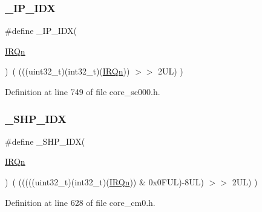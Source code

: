 \subsubsection{\texorpdfstring{\+\_\+\+I\+P\+\_\+\+I\+DX}{\_IP\_IDX}\hspace{0.1cm}{\footnotesize\ttfamily [3/3]}}
{\footnotesize\ttfamily \#define \+\_\+\+I\+P\+\_\+\+I\+DX(\begin{DoxyParamCaption}\item[{}]{\hyperlink{group___configuration__section__for___c_m_s_i_s_ga666eb0caeb12ec0e281415592ae89083}{I\+R\+Qn} }\end{DoxyParamCaption})~(   (((uint32\+\_\+t)(int32\+\_\+t)(\hyperlink{group___configuration__section__for___c_m_s_i_s_ga666eb0caeb12ec0e281415592ae89083}{I\+R\+Qn}))                $>$$>$    2\+U\+L)      )}



Definition at line 749 of file core\+\_\+sc000.\+h.

\mbox{\label{group___c_m_s_i_s___core___n_v_i_c_functions_gaee4f7eb5d7e770ad51489dbceabb1755}} 
\subsubsection{\texorpdfstring{\+\_\+\+S\+H\+P\+\_\+\+I\+DX}{\_SHP\_IDX}\hspace{0.1cm}{\footnotesize\ttfamily [1/3]}}
{\footnotesize\ttfamily \#define \+\_\+\+S\+H\+P\+\_\+\+I\+DX(\begin{DoxyParamCaption}\item[{}]{\hyperlink{group___configuration__section__for___c_m_s_i_s_ga666eb0caeb12ec0e281415592ae89083}{I\+R\+Qn} }\end{DoxyParamCaption})~( (((((uint32\+\_\+t)(int32\+\_\+t)(\hyperlink{group___configuration__section__for___c_m_s_i_s_ga666eb0caeb12ec0e281415592ae89083}{I\+R\+Qn})) \& 0x0\+F\+U\+L)-\/8\+U\+L) $>$$>$    2\+U\+L)      )}



Definition at line 628 of file core\+\_\+cm0.\+h.

\mbox{\label{group___c_m_s_i_s___core___n_v_i_c_functions_gaee4f7eb5d7e770ad51489dbceabb1755}} 

